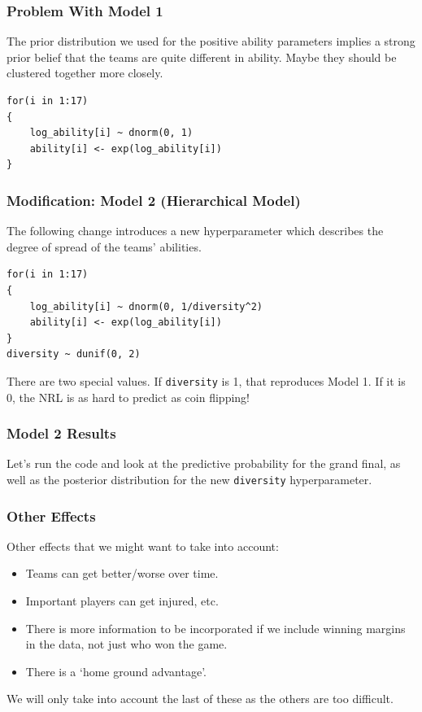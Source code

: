 \documentclass{beamer}
\begin{document}
\begin{frame}[fragile]
\frametitle{Problem With Model 1}
The prior distribution we used for the positive ability parameters
implies a strong prior belief that the teams are quite different in ability.
Maybe they should be clustered together more closely.

\begin{verbatim}
for(i in 1:17)
{
    log_ability[i] ~ dnorm(0, 1)
    ability[i] <- exp(log_ability[i])
}
\end{verbatim}

\end{frame}

\begin{frame}[fragile]
\frametitle{Modification: Model 2 (Hierarchical Model)}
The following change introduces a new hyperparameter which describes the
degree of spread of the teams' abilities.
\begin{verbatim}
for(i in 1:17)
{
    log_ability[i] ~ dnorm(0, 1/diversity^2)
    ability[i] <- exp(log_ability[i])
}
diversity ~ dunif(0, 2)
\end{verbatim}
\pause
There are two special values. If \texttt{diversity} is 1, that
reproduces Model 1. If it is 0, the NRL is as hard to predict as coin flipping!

\end{frame}



\begin{frame}[fragile]
\frametitle{Model 2 Results}
Let's run the code and look at the predictive probability for the grand final,
as well as the posterior distribution for the new \texttt{diversity}
hyperparameter.

\end{frame}


\begin{frame}
\frametitle{Other Effects}
Other effects that we might want to take into account:\pause
\begin{itemize}
\item Teams can get better/worse over time.\pause
\item Important players can get injured, etc.\pause
\item There is more information to be incorporated if we include winning
margins in the data, not just who won the game.\pause
\item There is a `home ground advantage'.\pause
\end{itemize}
We will only take into account the last of these as the others are too
difficult.


\end{frame}
\end{document}
